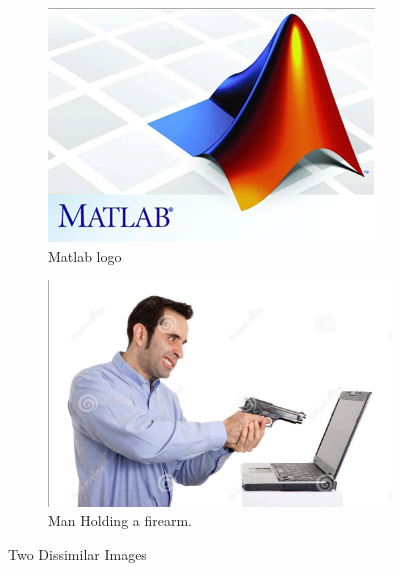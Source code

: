 \documentclass[12pt,journal,compsoc]{IEEEtran}
\begin{document}
\begin{figure}[h]
	\centering
	\begin{subfigure}{.25\textwidth}
		  \centering
		  \includegraphics[width=1\linewidth]{img/shoot1}
		  \caption{Matlab logo}
		  \label{fig:shoot1}
	\end{subfigure}%
	\begin{subfigure}{.25\textwidth}
		  \centering
		  \includegraphics[width=1\linewidth]{img/shoot2}
		  \caption{Man Holding a firearm.}
		  \label{fig:shoot2}
	\end{subfigure}
	\caption{Two Dissimilar Images}
	\label{fig:iso1}
\end{figure}
\end{document}
